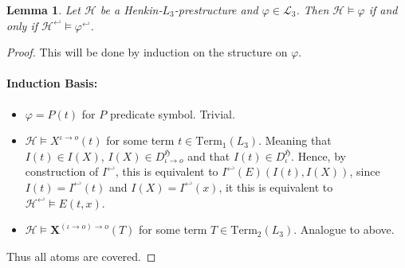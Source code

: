 \documentclass[11pt,a4paper]{article}
\newtheorem{lemma}[theorem]{Lemma}
\newcommand{\tofo}{\hookleftarrow}
\newcommand{\of}{\iota }
\newcommand{\os}{\iota \to o}
\newcommand{\ot}{(\iota \to o)\to o}
\begin{document}
\begin{lemma}
\label{lemma:tofo-equal}
Let $\mathcal{H}$ be a Henkin-$L_3$-prestructure and $\varphi \in \mathcal{L}_3$. Then $\mathcal{H} \models \varphi$ if and only if $\mathcal{H}^{\tofo} \models \varphi^{\tofo}$.
\end{lemma}
\begin{proof}
This will be done by induction on the structure on $\varphi$.

\paragraph*{Induction Basis:}
\begin{itemize}
\item $\varphi= P(t)$ for $P$ predicate symbol. Trivial.
\item $\mathcal{H} \models X^{\os}(t)$ for some term $t \in \mathrm{Term}_1(L_3)$. Meaning that $I(t) \in I(X)$, $I(X) \in D_{\os}^{\mathfrak{H}}$ and that $I(t) \in D_{\of}^{\mathfrak{H}}$. Hence, by construction of $I^{\tofo}$, this is equivalent to $I^{\tofo}(E)(I(t),I(X))$, since $I(t)=I^{\tofo}(t)$ and $I(X)=I^{\tofo}(x)$, it this is equivalent to $\mathcal{H}^{\tofo} \models E(t,x)$.
\item $\mathcal{H} \models \mathbf{X}^{\ot}(T)$ for some term $T \in \mathrm{Term}_2(L_3)$. Analogue to above.


\end{itemize}
Thus all atoms are covered.


\end{proof}
\end{document}
